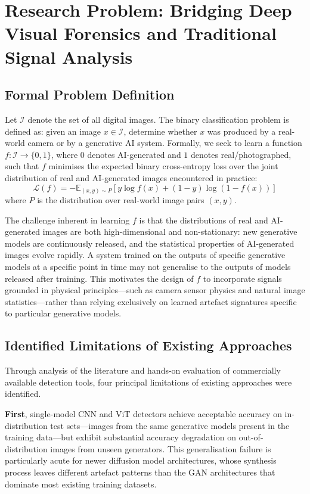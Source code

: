 \chapter{Research Problem: Bridging Deep Visual Forensics and Traditional Signal Analysis}
\label{ch:problem}

\section{Formal Problem Definition}

Let $\mathcal{I}$ denote the set of all digital images. The binary classification problem is defined as: given an image $x \in \mathcal{I}$, determine whether $x$ was produced by a real-world camera or by a generative AI system. Formally, we seek to learn a function $f: \mathcal{I} \rightarrow \{0, 1\}$, where $0$ denotes AI-generated and $1$ denotes real/photographed, such that $f$ minimises the expected binary cross-entropy loss over the joint distribution of real and AI-generated images encountered in practice:
\begin{equation}
    \mathcal{L}(f) = -\mathbb{E}_{(x,y) \sim P} \left[ y \log f(x) + (1-y) \log (1 - f(x)) \right]
\end{equation}
where $P$ is the distribution over real-world image pairs $(x, y)$.

The challenge inherent in learning $f$ is that the distributions of real and AI-generated images are both high-dimensional and non-stationary: new generative models are continuously released, and the statistical properties of AI-generated images evolve rapidly. A system trained on the outputs of specific generative models at a specific point in time may not generalise to the outputs of models released after training. This motivates the design of $f$ to incorporate signals grounded in physical principles---such as camera sensor physics and natural image statistics---rather than relying exclusively on learned artefact signatures specific to particular generative models.

\section{Identified Limitations of Existing Approaches}

Through analysis of the literature and hands-on evaluation of commercially available detection tools, four principal limitations of existing approaches were identified.

\textbf{First}, single-model CNN and ViT detectors achieve acceptable accuracy on in-distribution test sets---images from the same generative models present in the training data---but exhibit substantial accuracy degradation on out-of-distribution images from unseen generators. This generalisation failure is particularly acute for newer diffusion model architectures, whose synthesis process leaves different artefact patterns than the GAN architectures that dominate most existing training datasets.

